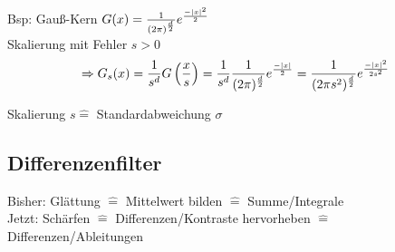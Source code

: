 Bsp: Gauß-Kern $G(x) = \frac{1}{(2 \pi)^{\frac{d}{2}}} e^{\frac{-\left\lvert x \right\rvert^2}{2}}$\\
Skalierung mit Fehler $s > 0$
$$ \Rightarrow G_s(x) = \frac{1}{s^d} G\left( \frac {x} {s} \right) = \frac{1}{s^d} \frac{1}{(2 \pi)^{\frac{d}{2}}} e^{\frac{-\left\lvert x \right\rvert}{2}} = \frac{1}{(2 \pi s^2)^{\frac{d}{2}}} e^{\frac{-\left\lvert x \right\rvert^2}{2s^2}}$$

Skalierung $s \hat = $ Standardabweichung $\sigma$

\newcommand{\mtitle}[1] {
    \begin{center}
        \large{\textbf{#1}}
    \end{center}
}

\newcommand{\filter}[1] {
	\begin{tabular}{|c|c|c|}
		\hline
		#1\\
		\hline
	\end{tabular}
	}
	

\subsection{Differenzenfilter}

    Bisher: Glättung $\widehat =$ Mittelwert bilden $\widehat =$ Summe/Integrale\\
    Jetzt: Schärfen $\widehat =$ Differenzen/Kontraste hervorheben $\widehat =$ Differenzen/Ableitungen\\

